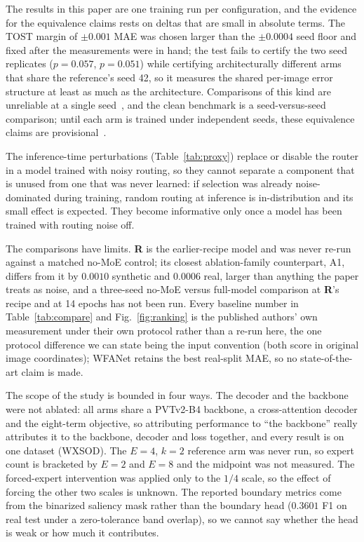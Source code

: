 \documentclass[10pt,a4paper,twocolumn,twoside]{article}
\begin{document}
The results in this paper are one training run per configuration, and the evidence for the
equivalence claims rests on deltas that are small in absolute terms. The TOST margin of
$\pm0.001$ MAE was chosen larger than the $\pm0.0004$ seed floor and fixed after the
measurements were in hand; the test fails to certify the two seed replicates ($p=0.057$,
$p=0.051$) while certifying architecturally different arms that share the reference's seed 42,
so it measures the shared per-image error structure at least as much as the architecture.
Comparisons of this kind are unreliable at a single seed~\cite{bouthillier2021variance,picard2021seed,melis2018state},
and the clean benchmark is a seed-versus-seed comparison; until each arm is trained under
independent seeds, these equivalence claims are provisional~\cite{lipton2019troubling}.

The inference-time perturbations (Table~\ref{tab:proxy}) replace or disable the router in a
model trained with noisy routing, so they cannot separate a component that is unused from one
that was never learned: if selection was already noise-dominated during training, random
routing at inference is in-distribution and its small effect is expected. They become
informative only once a model has been trained with routing noise off.

The comparisons have limits. \textbf{R} is the earlier-recipe model and was never
re-run against a matched no-MoE control; its closest ablation-family counterpart, A1, differs
from it by $0.0010$ synthetic and $0.0006$ real, larger than anything the paper treats as
noise, and a three-seed no-MoE versus full-model comparison at \textbf{R}'s recipe and at 14
epochs has not been run. Every baseline number in Table~\ref{tab:compare} and
Fig.~\ref{fig:ranking} is the published authors' own measurement under their own protocol
rather than a re-run here, the one protocol difference we can state being the input convention
(both score in original image coordinates); WFANet retains the best real-split MAE, so no
state-of-the-art claim is made.

The scope of the study is bounded in four ways. The decoder and the backbone were not
ablated: all arms share a PVTv2-B4 backbone, a cross-attention decoder and the eight-term
objective, so attributing performance to ``the backbone'' really attributes it to the
backbone, decoder and loss together, and every result is on one dataset (WXSOD). The
$E{=}4$, $k{=}2$ reference arm was never run, so expert count is bracketed by $E{=}2$ and
$E{=}8$ and the midpoint was not measured. The forced-expert intervention was applied only to
the $1/4$ scale, so the effect of forcing the other two scales is unknown. The reported
boundary metrics come from the binarized saliency mask rather than the boundary head ($0.3601$
F1 on real test under a zero-tolerance band overlap), so we cannot say whether the head is
weak or how much it contributes.
\end{document}
